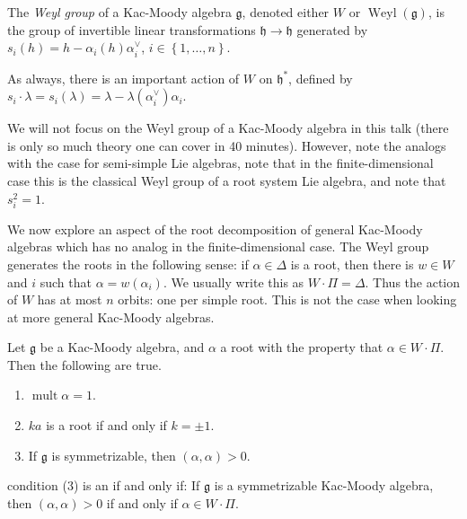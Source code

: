 \documentclass[11pt, letterpaper]{article}
\theoremstyle{plain}
\begin{document}
\begin{definition}\label{dfn:5-1}
	The \emph{Weyl group} of a Kac-Moody algebra $\mathfrak{g} $, denoted either $W$ or $\operatorname{Weyl} (\mathfrak{g} )$, is the group of invertible linear transformations $\mathfrak{h} \to \mathfrak{h} $ generated by $s_i(h) = h - \alpha _i(h)\alpha ^\vee _i$, $i\in \left\{ 1, \ldots ,n \right\} $.
\end{definition}

As always, there is an important action of $W$ on $\mathfrak{h} ^*$, defined by $s_i\cdot \lambda = s_i(\lambda ) = \lambda -\lambda (\alpha _i^\vee )\alpha_i$.

We will not focus on the Weyl group of a Kac-Moody algebra in this talk (there is only so much theory one can cover in 40 minutes). However, note the analogs with the case for semi-simple Lie algebras, note that in the finite-dimensional case this is the classical Weyl group of a root system Lie algebra, and note that $s_i^2=1$.


We now explore an aspect of the root decomposition of general Kac-Moody algebras which has no analog in the finite-dimensional case. The Weyl group generates the roots in the following sense: if $\alpha \in \Delta $ is a root, then there is $w\in W$ and $i$ such that $\alpha =w(\alpha _i)$. We usually write this as $W\cdot \Pi =\Delta $. Thus the action of $W$ has at most $n$ orbits: one per simple root. This is not the case when looking at more general Kac-Moody algebras.

\begin{proposition}\label{prp:5-2}
	Let $\mathfrak{g} $ be a Kac-Moody algebra, and $\alpha $ a root with the property that $\alpha \in W\cdot \Pi $. Then the following are true.
	\begin{enumerate}[align=left, label=(\arabic*)]
		\item $\operatorname{mult} \alpha =1$.
		\item $ka$ is a root if and only if $k=\pm 1$.
		\item If $\mathfrak{g} $ is symmetrizable, then $(\alpha ,\alpha )>0$.
	\end{enumerate}
\end{proposition}

\begin{remark}\label{rmk:5-3}
	 condition (3) is an if and only if: If $\mathfrak{g} $ is a symmetrizable Kac-Moody algebra, then $(\alpha ,\alpha )>0$ if and only if $\alpha \in W\cdot \Pi $.
\end{remark}
\end{document}
